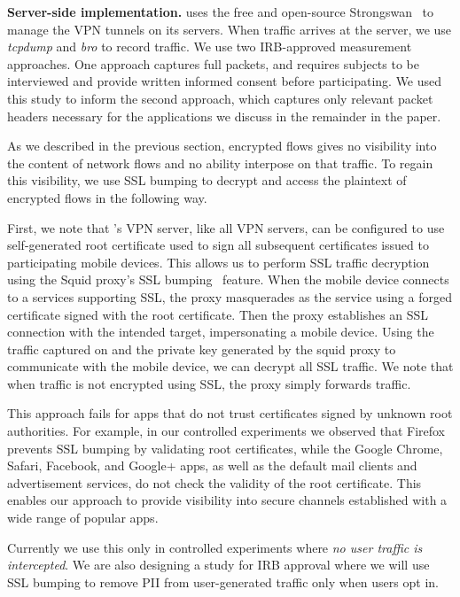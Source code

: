 \noindent\textbf{Server-side implementation.} 
\meddle uses the free and open-source Strongswan~\cite{strongswan} to manage the VPN tunnels 
on its servers. When traffic arrives at the server, we use \emph{tcpdump} and \emph{bro} to record 
traffic. We use two IRB-approved measurement approaches. One approach captures full packets, 
and requires subjects to be interviewed and provide written informed consent before participating. 
We used this study to inform the second approach, which captures only relevant packet headers 
necessary for the applications we discuss in the remainder in the paper. 

As we described in the previous section, encrypted flows gives \meddle no visibility into the 
content of network flows and no ability interpose on that traffic. To regain this visibility, we use SSL 
bumping to decrypt and access the plaintext of encrypted flows in the following way. 
 
First, we note that \meddle's VPN server, like all VPN servers, can be configured to use self-generated root certificate used to sign all subsequent certificates issued to participating mobile devices. 
This allows us to perform SSL traffic decryption using the Squid proxy's SSL bumping~\cite{sslbump} feature.
When the mobile device connects to a services supporting SSL, the proxy masquerades as the service using a forged certificate signed with the \meddle root certificate. 
Then the proxy establishes an SSL connection with the intended target, impersonating a mobile device. 
Using the traffic captured on \meddle and the private key generated by the squid proxy to communicate with the mobile device, we can decrypt all SSL traffic. We note that when traffic is not encrypted using SSL, the proxy simply forwards traffic. 

This approach fails for apps that do not trust certificates signed by unknown root authorities. 
For example, in our controlled experiments we observed that Firefox prevents SSL bumping by validating root certificates, while the Google Chrome, Safari, Facebook, and Google+ apps, as well as the default mail clients and advertisement services, do not check the validity of the root certificate. 
This enables our approach to provide visibility into secure channels established with a wide range of popular apps. 

Currently we use this only in controlled experiments 
where \emph{no user traffic is intercepted}. We are also designing a study for IRB approval where we 
will use SSL bumping to remove PII from user-generated traffic only when users opt in.

